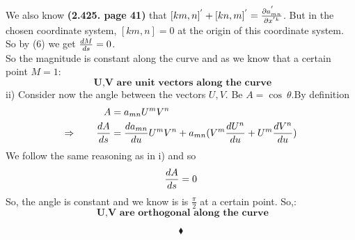 We also know \textbf{(2.425. page 41)} that $[km,n]^{'} + [kn,m]^{'} = \pdv{a^{'}_{mn}}{x^{'k}}$. But in the chosen coordinate system, $[km,n] = 0$ at the origin of this coordinate system. So by (6) we get $\dv{M}{s} = 0$.\\
So the magnitude is constant along the curve and as we know that a certain point $M =1$:\\
$$\textbf{ U,V are unit vectors along the curve}$$\newpage
ii) Consider now the angle between the vectors $U,V$. Be $A = \cos \ \theta$.By definition 
\begin{align}
\ A &= a_{mn}U ^mV^n\\
\Rightarrow \quad\quad \dv{A}{s} &= \dv{a_{mn}}{u}U^m V^n + a_{mn}(V^m \dv{U^n}{u} +U^m \dv{V^n}{u} )
\end{align}
We follow the same reasoning as in i) and so
$$\dv{A}{s} = 0$$
So, the angle is constant and we know is is $\frac{\pi}{2}$ at a certain point. So,:
$$\textbf{ U,V are orthogonal along the curve}$$

$$\blacklozenge$$
\newpage

